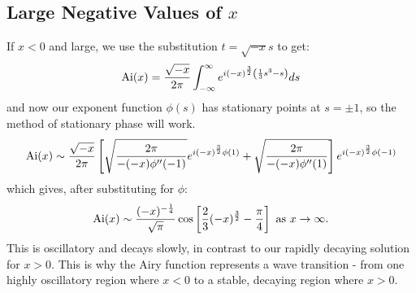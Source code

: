 \documentclass[../Main.tex]{subfiles}
\begin{document}
\subsection{Large Negative Values of \texorpdfstring{$x$}{the Parameter}}
If $x < 0$ and large, we use the substitution $t = \sqrt{-x} s$ to get:
\begin{equation*}
    \operatorname{Ai}(x) = \frac{\sqrt{-x}}{2\pi} \int_{-\infty}^{\infty} e^{i(-x)^{\frac32} \left(\frac13 s^3 - s\right)} ds 
\end{equation*}
and now our exponent function $\phi(s)$ has stationary points at $s = \pm 1$, so the method of stationary phase will work.
\begin{equation*}
    \operatorname{Ai}(x) \sim \frac{\sqrt{-x}}{2\pi} \left[\sqrt{\frac{2\pi}{-(-x)\phi''(-1)}}e^{i(-x)^{\frac32} \phi(1)} + \sqrt{\frac{2\pi}{-(-x)\phi''(1)}}\right] e^{i(-x)^{\frac32} \phi(-1)}
\end{equation*}
which gives, after substituting for $\phi$:
\begin{equation*}
    \operatorname{Ai}(x) \sim \frac{(-x)^{-\frac14}}{\sqrt{\pi}} \cos\left[\frac23 (-x)^{\frac32} - \frac\pi4\right] \text{ as } x \to \infty.
\end{equation*}
This is oscillatory and decays slowly, in contrast to our rapidly decaying solution for $x > 0$. This is why the Airy function represents a wave transition - from one highly oscillatory region where $x < 0$ to a stable, decaying region where $x > 0$.
\end{document}
